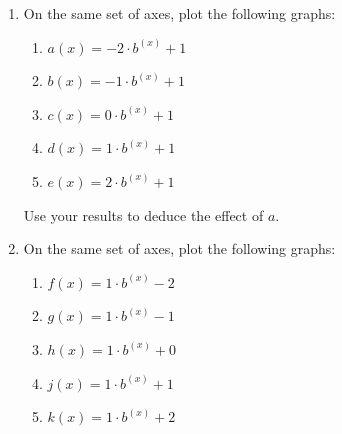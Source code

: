         
        \label{m39348*id249746}\begin{enumerate}[noitemsep, label=\textbf{\arabic*}. ] 
            \label{m39348*uid174}\item On the same set of axes, plot the following graphs:
\label{m39348*id249761}\begin{enumerate}[noitemsep, label=\textbf{\alph*}. ] 
            \label{m39348*uid175}\item \begin{math}a\left(x\right)=-2\ensuremath{\cdot}{b}^{\left(x\right)}+1\end{math}\label{m39348*uid176}\item \begin{math}b\left(x\right)=-1\ensuremath{\cdot}{b}^{\left(x\right)}+1\end{math}\label{m39348*uid177}\item \begin{math}c\left(x\right)=0\ensuremath{\cdot}{b}^{\left(x\right)}+1\end{math}\label{m39348*uid178}\item \begin{math}d\left(x\right)=1\ensuremath{\cdot}{b}^{\left(x\right)}+1\end{math}\label{m39348*uid179}\item \begin{math}e\left(x\right)=2\ensuremath{\cdot}{b}^{\left(x\right)}+1\end{math}\end{enumerate}
        
Use your results to deduce the effect of \begin{math}a\end{math}.
\label{m39348*uid180}\item On the same set of axes, plot the following graphs:
\label{m39348*id250057}\begin{enumerate}[noitemsep, label=\textbf{\alph*}. ] 
            \label{m39348*uid181}\item \begin{math}f\left(x\right)=1\ensuremath{\cdot}{b}^{\left(x\right)}-2\end{math}\label{m39348*uid182}\item \begin{math}g\left(x\right)=1\ensuremath{\cdot}{b}^{\left(x\right)}-1\end{math}\label{m39348*uid183}\item \begin{math}h\left(x\right)=1\ensuremath{\cdot}{b}^{\left(x\right)}+0\end{math}\label{m39348*uid184}\item \begin{math}j\left(x\right)=1\ensuremath{\cdot}{b}^{\left(x\right)}+1\end{math}\label{m39348*uid185}\item \begin{math}k\left(x\right)=1\ensuremath{\cdot}{b}^{\left(x\right)}+2\end{math}\end{enumerate}
        

\end{enumerate}
